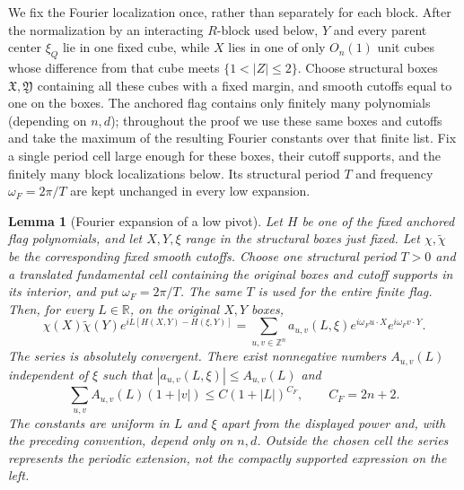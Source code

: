 \documentclass[11pt]{article}
\numberwithin{equation}{section}
\newtheorem{lemma}[theorem]{Lemma}
\theoremstyle{remark}
\theoremstyle{definition}
\newcommand{\R}{\mathbb R}
\begin{document}
We fix the Fourier localization once, rather than separately for each
block.  After the normalization by an interacting $R$-block used below,
$Y$ and every parent center $\xi_Q$ lie in one fixed cube, while $X$ lies
in one of only $O_n(1)$ unit cubes whose difference from that cube meets
$\{1<|Z|\le2\}$.  Choose structural boxes
$\mathfrak X,\mathfrak Y$ containing all these cubes with a fixed margin,
and smooth cutoffs equal to one on the boxes.  The anchored flag contains
only finitely many polynomials (depending on $n,d$); throughout the proof
we use these same boxes and cutoffs and take the maximum of the resulting
Fourier constants over that finite list.  Fix a single period cell large
enough for these boxes, their cutoff supports, and the finitely many
block localizations below.  Its structural period $T$ and frequency
$\omega_F=2\pi/T$ are kept unchanged in every low expansion.

\begin{lemma}[Fourier expansion of a low pivot]\label{lem:fourierpivot}
Let $H$ be one of the fixed anchored flag polynomials, and let $X,Y,\xi$
range in the structural boxes just fixed.  Let
$\chi,\widetilde\chi$ be the corresponding fixed smooth cutoffs.
Choose one structural period $T>0$ and a translated fundamental cell
containing the original boxes and cutoff supports in its interior, and put
$\omega_F=2\pi/T$.  The same $T$ is used for the entire finite flag.
Then, for every $L\in\R$, on the original $X,Y$ boxes,
\[
 \chi(X)\widetilde\chi(Y)
 e^{iL[H(X,Y)-H(\xi,Y)]}
 =\sum_{u,v\in\mathbb Z^n}a_{u,v}(L,\xi)
   e^{i\omega_F u\cdot X}e^{i\omega_F v\cdot Y}.
\]
The series is absolutely convergent.  There exist nonnegative numbers
$A_{u,v}(L)$ independent of $\xi$ such that
$|a_{u,v}(L,\xi)|\le A_{u,v}(L)$ and
\begin{equation}\label{eq:fourierpivot}
 \sum_{u,v}A_{u,v}(L)(1+|v|)
 \le C(1+|L|)^{C_F},\qquad C_F=2n+2.
\end{equation}
The constants are uniform in $L$ and $\xi$ apart from the displayed
power and, with the preceding convention, depend only on $n,d$.
Outside the chosen cell the series represents the periodic extension,
not the compactly supported expression on the left.
\end{lemma}
\end{document}
